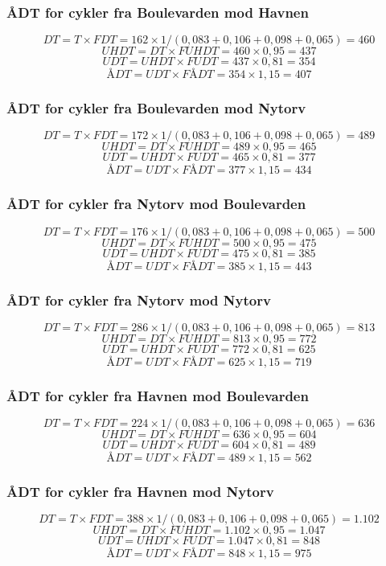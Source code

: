 \subsubsection{ÅDT for cykler fra Boulevarden mod Havnen}
$$DT = T \times FDT = 162 \times 1/(0,083+0,106+0,098+0,065) = 460 $$
$$UHDT = DT \times FUHDT = 460 \times 0,95 = 437$$
$$UDT = UHDT \times FUDT = 437 \times 0,81 = 354$$
$$ÅDT = UDT \times FÅDT = 354 \times 1,15 = 407$$
\subsubsection{ÅDT for cykler fra Boulevarden mod Nytorv}
$$DT = T \times FDT = 172 \times 1/(0,083+0,106+0,098+0,065) = 489$$
$$UHDT = DT \times FUHDT = 489 \times 0,95 = 465$$
$$UDT = UHDT \times FUDT = 465 \times 0,81 = 377$$
$$ÅDT = UDT \times FÅDT = 377 \times 1,15 = 434$$
\subsubsection{ÅDT for cykler fra Nytorv mod Boulevarden}
$$DT = T \times FDT = 176 \times 1/(0,083+0,106+0,098+0,065) = 500$$
$$UHDT = DT \times FUHDT = 500 \times 0,95 = 475$$
$$UDT = UHDT \times FUDT = 475 \times 0,81 = 385$$
$$ÅDT = UDT \times FÅDT = 385 \times 1,15 = 443$$
\subsubsection{ÅDT for cykler fra Nytorv mod Nytorv}
$$DT = T \times FDT = 286 \times 1/(0,083+0,106+0,098+0,065) = 813$$
$$UHDT = DT \times FUHDT = 813 \times 0,95 = 772$$
$$UDT = UHDT \times FUDT = 772 \times 0,81 = 625$$
$$ÅDT = UDT \times FÅDT = 625 \times 1,15 = 719$$
\subsubsection{ÅDT for cykler fra Havnen mod Boulevarden}
$$DT = T \times FDT = 224 \times 1/(0,083+0,106+0,098+0,065) = 636$$
$$UHDT = DT \times FUHDT = 636 \times 0,95 = 604$$
$$UDT = UHDT \times FUDT = 604 \times 0,81 = 489$$
$$ÅDT = UDT \times FÅDT = 489 \times 1,15 = 562$$
\subsubsection{ÅDT for cykler fra Havnen mod Nytorv}
$$DT = T \times FDT = 388 \times 1/(0,083+0,106+0,098+0,065) = 1.102$$
$$UHDT = DT \times FUHDT = 1.102 \times 0,95 = 1.047$$
$$UDT = UHDT \times FUDT = 1.047 \times 0,81 = 848$$ 
$$ÅDT = UDT \times FÅDT = 848 \times 1,15 = 975$$
